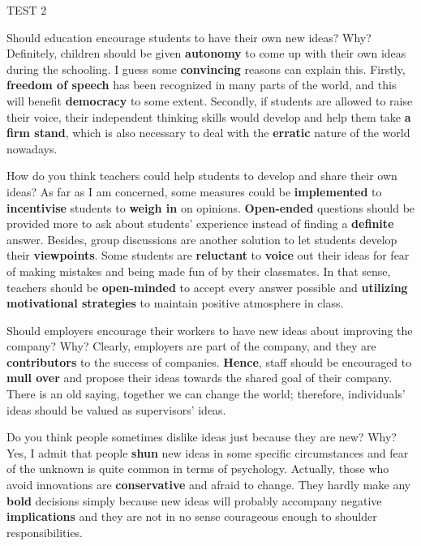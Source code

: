 \begin{glossarymc}[Cambridge 7]
\begin{test}{TEST 2}
    \begin{qa}{Should education encourage students to have their own new ideas? Why?}
    Definitely, children should be given \textbf{autonomy} to come up with their own ideas during the schooling. I guess some \textbf{convincing} reasons can explain this. Firstly, \textbf{freedom of speech} has been recognized in many parts of the world, and this will benefit \textbf{democracy} to some extent. Secondly, if students are allowed to raise their voice, their independent thinking skills would develop and help them take \textbf{a firm stand}, which is also necessary to deal with the \textbf{erratic} nature of the world nowadays.
    \end{qa}

    \begin{qa}{How do you think teachers could help students to develop and share their own ideas?}
    As far as I am concerned, some measures could be \textbf{implemented} to \textbf{incentivise} students to \textbf{weigh in} on opinions. \textbf{Open-ended} questions should be provided more to ask about students’ experience instead of finding a \textbf{definite} answer. Besides, group discussions are another solution to let students develop their \textbf{viewpoints}. Some students are \textbf{reluctant} to \textbf{voice} out their ideas for fear of making mistakes and being made fun of by their classmates. In that sense, teachers should be \textbf{open-minded} to accept every answer possible and \textbf{utilizing motivational strategies} to maintain positive atmosphere in class.
    \end{qa}

    \begin{qa}{Should employers encourage their workers to have new ideas about improving the company? Why?}
    Clearly, employers are part of the company, and they are \textbf{contributors} to the success of companies. \textbf{Hence}, staff should be encouraged to \textbf{mull over} and propose their ideas towards the shared goal of their company. There is an old saying, together we can change the world; therefore, individuals’ ideas should be valued as supervisors’ ideas.
    \end{qa}

    \begin{qa}{Do you think people sometimes dislike ideas just because they are new? Why?}
    Yes, I admit that people \textbf{shun} new ideas in some specific circumstances and fear of the unknown is quite common in terms of psychology. Actually, those who avoid innovations are \textbf{conservative} and afraid to change. They hardly make any \textbf{bold} decisions simply because new ideas will probably accompany negative \textbf{implications} and they are not in no sense courageous enough to shoulder responsibilities.
    \end{qa}


\end{test}
\end{glossarymc}
